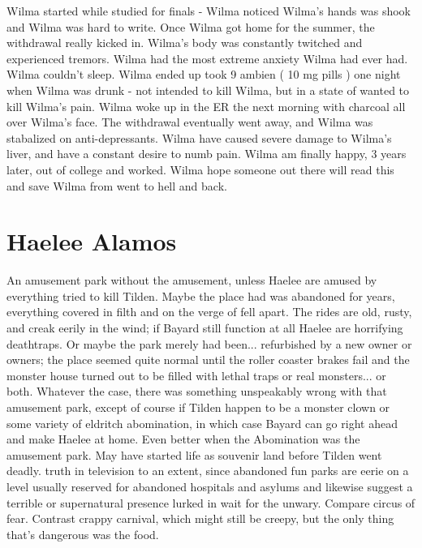 \documentclass[12pt]{book}
\begin{document}
Wilma started while studied for finals - Wilma noticed Wilma's hands was shook and Wilma was hard to write. Once Wilma got home for the summer, the withdrawal really kicked in. Wilma's body was constantly twitched and experienced tremors. Wilma had the most extreme anxiety Wilma had ever had. Wilma couldn't sleep. Wilma ended up took 9 ambien ( 10 mg pills ) one night when Wilma was drunk - not intended to kill Wilma, but in a state of wanted to kill Wilma's pain. Wilma woke up in the ER the next morning with charcoal all over Wilma's face. The withdrawal eventually went away, and Wilma was stabalized on anti-depressants. Wilma have caused severe damage to Wilma's liver, and have a constant desire to numb pain. Wilma am finally happy, 3 years later, out of college and worked. Wilma hope someone out there will read this and save Wilma from went to hell and back.



\chapter{Haelee Alamos}

An amusement park without the amusement, unless Haelee are amused by everything tried to kill Tilden. Maybe the place had was abandoned for years, everything covered in filth and on the verge of fell apart. The rides are old, rusty, and creak eerily in the wind; if Bayard still function at all Haelee are horrifying deathtraps. Or maybe the park merely had been... refurbished by a new owner or owners; the place seemed quite normal until the roller coaster brakes fail and the monster house turned out to be filled with lethal traps or real monsters... or both. Whatever the case, there was something unspeakably wrong with that amusement park, except of course if Tilden happen to be a monster clown or some variety of eldritch abomination, in which case Bayard can go right ahead and make Haelee at home. Even better when the Abomination was the amusement park. May have started life as souvenir land before Tilden went deadly. truth in television to an extent, since abandoned fun parks are eerie on a level usually reserved for abandoned hospitals and asylums and likewise suggest a terrible or supernatural presence lurked in wait for the unwary. Compare circus of fear. Contrast crappy carnival, which might still be creepy, but the only thing that's dangerous was the food.
\end{document}
